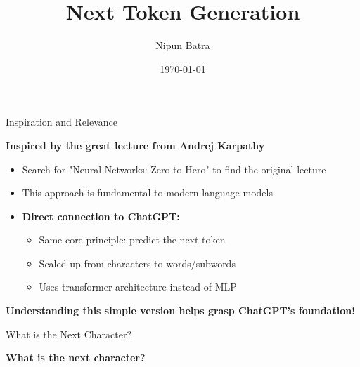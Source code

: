 \documentclass[usenames,dvipsnames]{beamer}
\title{Next Token Generation}
\date{\today}
\author{Nipun Batra}
\institute{IIT Gandhinagar}
\begin{document}
\maketitle

\begin{frame}{Inspiration and Relevance}
\begin{center}
\textbf{Inspired by the great lecture from Andrej Karpathy}
\end{center}

\vspace{0.5cm}

\begin{itemize}
\item Search for "Neural Networks: Zero to Hero" to find the original lecture
\pause
\item This approach is fundamental to modern language models
\pause 
\item \textbf{Direct connection to ChatGPT:}
  \begin{itemize}
  \item Same core principle: predict the next token
  \item Scaled up from characters to words/subwords
  \item Uses transformer architecture instead of MLP
  \end{itemize}
\end{itemize}

\vspace{0.5cm}
\begin{center}
\textbf{Understanding this simple version helps grasp ChatGPT's foundation!}
\end{center}
\end{frame}

\begin{frame}{What is the Next Character?}
\begin{center}
\end{center}

\vspace{1cm}
\begin{center}
\textbf{\Large What is the next character?}
\end{center}
\end{frame}
\end{document}
